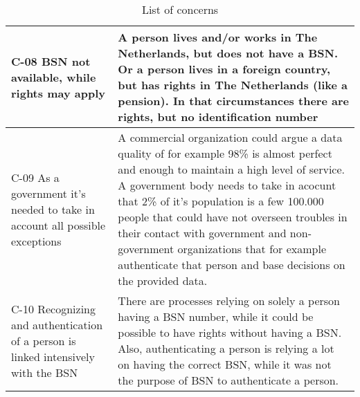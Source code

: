 \begin{table}
\begin{tabular}{ |p{5cm}||p{11cm}|}
\hline
C-08 BSN not available, while rights may apply & A person lives and/or works in The Netherlands, but does not have a BSN. Or a person lives in a foreign country, but has rights in The Netherlands (like a pension). In that circumstances there are rights, but no identification number\\
\hline
C-09 As a government it’s needed to take in account all possible exceptions & A commercial organization could argue a data quality of for example 98\% is almost perfect and enough to maintain a high level of service. A government body needs to take in acocunt that 2\% of it's population is a few 100.000 people that could have not overseen troubles in their contact with government and non-government organizations that for example authenticate that person and base decisions on the provided data. \\
\hline
C-10 Recognizing and authentication of a person is linked intensively with the BSN & There are processes relying on solely a person having a BSN number, while it could be possible to have rights without having a BSN. Also, authenticating a person is relying a lot on having the correct BSN, while it was not the purpose of BSN to authenticate a person.
 \\
\hline
\end{tabular}
\caption{List of concerns}
\label{table:3}
\end{table}




